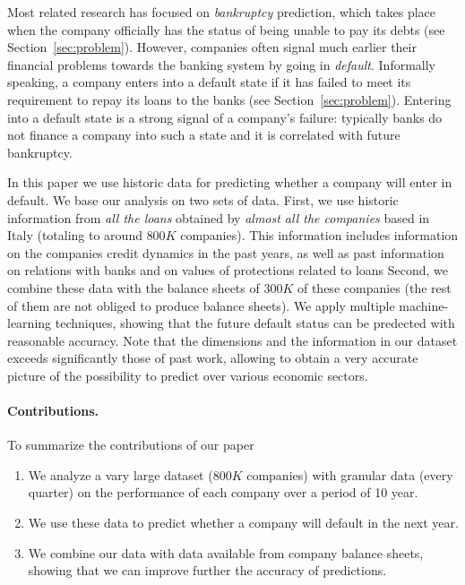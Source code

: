 
Most related research has focused on \emph{bankruptcy} prediction, which
takes place when the company officially has the status of being unable
to pay its debts (see Section~\ref{sec:problem}). However, companies
often signal much earlier their financial problems towards the banking
system by going in \emph{default}. Informally speaking, a company enters
into a default state if it has failed to meet its requirement to repay
its loans to the banks (see Section~\ref{sec:problem}). Entering into a
default state is a strong signal of a company's failure: typically banks
do not finance a company into such a state and it is correlated with
future bankruptcy.

In this paper we use historic data for predicting whether a company will
enter in default. We base our analysis on two sets of data. First, we
use historic information from \emph{all the loans} obtained by \emph{almost all
the companies} based in Italy (totaling to around $800K$ companies).
This information includes information on the companies credit dynamics in the past
years, as well as past information on relations with banks and on values of protections related to loans
Second, we combine these data with the balance sheets of $300K$
of these companies (the rest of them are not obliged to produce balance
sheets). We apply multiple machine-learning techniques, showing that the
future default status can be predected with reasonable accuracy.
Note that the dimensions and the information in our dataset exceeds
significantly those of past work, allowing to obtain a very accurate
picture of the possibility to predict over various economic sectors.


\paragraph{Contributions.} To summarize the contributions of our paper
\begin{enumerate}
\item We analyze a vary large dataset ($800K$ companies) with granular
data (every quarter) on the performance of each company over a period of
10 year. 
\item We use these data to predict whether a company will default in the
next year.
\item We combine our data with data available from company balance
sheets, showing that we can improve further the accuracy of predictions.
\end{enumerate}

